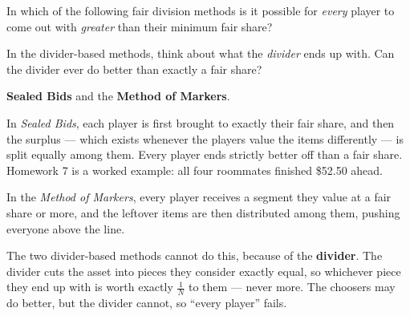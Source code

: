 \documentclass[12pt]{ximera}
\begin{document}
\begin{problem}
In which of the following fair division methods is it possible for \emph{every} player
to come out with \emph{greater} than their minimum fair share?

\begin{selectAll}
\end{selectAll}

\begin{hint}
In the divider-based methods, think about what the \emph{divider} ends up with. Can the
divider ever do better than exactly a fair share?
\end{hint}

\begin{feedback}
\textbf{Sealed Bids} and the \textbf{Method of Markers}.

In \emph{Sealed Bids}, each player is first brought to exactly their fair share, and
then the surplus --- which exists whenever the players value the items differently ---
is split equally among them. Every player ends strictly better off than a fair share.
Homework 7 is a worked example: all four roommates finished \$52.50 ahead.

In the \emph{Method of Markers}, every player receives a segment they value at a fair
share or more, and the leftover items are then distributed among them, pushing
everyone above the line.

The two divider-based methods cannot do this, because of the \textbf{divider}. The
divider cuts the asset into pieces they consider exactly equal, so whichever piece they
end up with is worth exactly $\frac1N$ to them --- never more. The choosers may do
better, but the divider cannot, so ``every player'' fails.
\end{feedback}
\end{problem}
\end{document}
